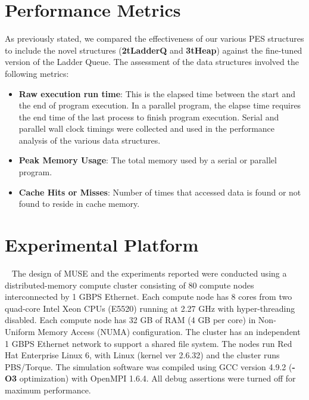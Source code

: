 \section{Performance Metrics}
As previously stated, we compared the effectiveness of our various PES structures to include the novel structures (\textbf{2tLadderQ} and \textbf{3tHeap}) against the fine-tuned version of the Ladder Queue. The assessment of the data structures involved the following metrics: 
\begin{itemize}
\item[\ding{182}] \textbf{Raw execution run time}: This is the elapsed time between the start and the end of program execution. In a parallel program, the elapse time requires the end time of the last process to finish program execution. Serial and parallel wall clock timings were collected and used in the performance analysis of the various data structures.
\item[\ding{186}] \textbf{Peak Memory Usage}: The total memory used by a serial or parallel program.
\item[\ding{187}] \textbf{Cache Hits or Misses}: Number of times that accessed data is found or not found to reside in cache memory.
\end{itemize}

\section{Experimental Platform}~\label{sec:platform}
The design of MUSE and the experiments reported were conducted using a distributed-memory compute cluster consisting of 80 compute nodes interconnected by 1 GBPS Ethernet. Each compute node has 8 cores from two quad-core Intel Xeon \textregistered CPUs (E5520) running at 2.27 GHz with hyper-threading disabled. Each compute node has 32 GB of RAM (4 GB per core) in Non-Uniform Memory Access (NUMA) configuration. The cluster has an independent 1 GBPS Ethernet network to support a shared file system. The nodes run Red Hat Enterprise Linux 6, with Linux (kernel ver 2.6.32) and the cluster runs PBS/Torque. The simulation software was compiled using GCC version 4.9.2 (\textbf{-O3} optimization) with OpenMPI 1.6.4. All debug assertions were turned off for maximum performance.
